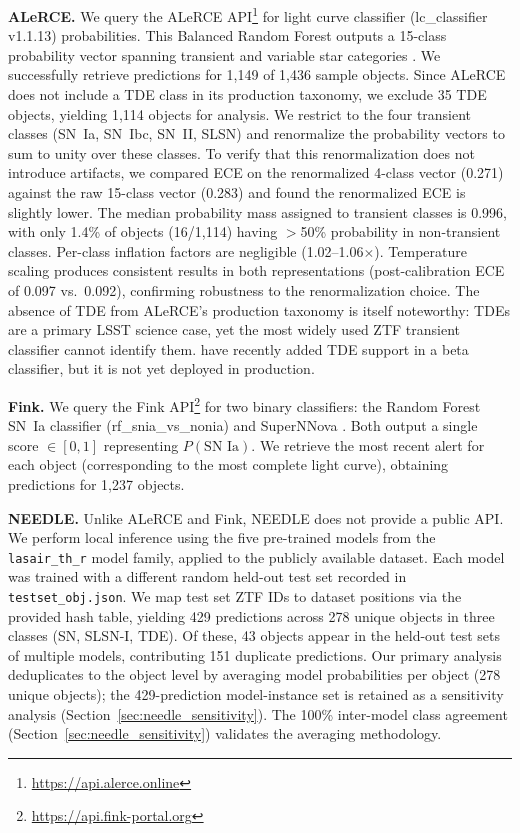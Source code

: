 \documentclass[twocolumn]{aastex631}
\begin{document}
\textbf{ALeRCE.} We query the ALeRCE API\footnote{\url{https://api.alerce.online}} for light curve classifier (lc\_classifier v1.1.13) probabilities. This Balanced Random Forest outputs a 15-class probability vector spanning transient and variable star categories \citep{sanchezsaez2021}. We successfully retrieve predictions for 1,149 of 1,436 sample objects. Since ALeRCE does not include a TDE class in its production taxonomy, we exclude 35 TDE objects, yielding 1,114 objects for analysis. We restrict to the four transient classes (SN~Ia, SN~Ibc, SN~II, SLSN) and renormalize the probability vectors to sum to unity over these classes. To verify that this renormalization does not introduce artifacts, we compared ECE on the renormalized 4-class vector (0.271) against the raw 15-class vector (0.283) and found the renormalized ECE is slightly lower. The median probability mass assigned to transient classes is 0.996, with only 1.4\% of objects (16/1,114) having $>$50\% probability in non-transient classes. Per-class inflation factors are negligible (1.02--1.06$\times$). Temperature scaling produces consistent results in both representations (post-calibration ECE of 0.097 vs.\ 0.092), confirming robustness to the renormalization choice. The absence of TDE from ALeRCE's production taxonomy is itself noteworthy: TDEs are a primary LSST science case, yet the most widely used ZTF transient classifier cannot identify them. \citet{pavezherrera2025} have recently added TDE support in a beta classifier, but it is not yet deployed in production.

\textbf{Fink.} We query the Fink API\footnote{\url{https://api.fink-portal.org}} for two binary classifiers: the Random Forest SN~Ia classifier (rf\_snia\_vs\_nonia) and SuperNNova \citep[snn\_snia\_vs\_nonia;][]{moller2020}. Both output a single score $\in [0,1]$ representing $P(\text{SN~Ia})$. We retrieve the most recent alert for each object (corresponding to the most complete light curve), obtaining predictions for 1,237 objects.

\textbf{NEEDLE.} Unlike ALeRCE and Fink, NEEDLE \citep{sheng2024} does not provide a public API. We perform local inference using the five pre-trained models from the \texttt{lasair\_th\_r} model family, applied to the publicly available dataset. Each model was trained with a different random held-out test set recorded in \texttt{testset\_obj.json}. We map test set ZTF IDs to dataset positions via the provided hash table, yielding 429 predictions across 278 unique objects in three classes (SN, SLSN-I, TDE). Of these, 43 objects appear in the held-out test sets of multiple models, contributing 151 duplicate predictions. Our primary analysis deduplicates to the object level by averaging model probabilities per object (278 unique objects); the 429-prediction model-instance set is retained as a sensitivity analysis (Section~\ref{sec:needle_sensitivity}). The 100\% inter-model class agreement (Section~\ref{sec:needle_sensitivity}) validates the averaging methodology.
\end{document}
